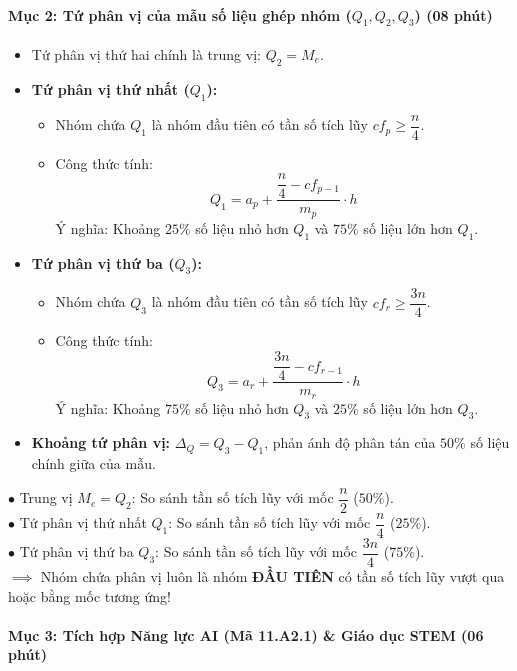 \documentclass[12pt, a4paper]{article}
\begin{document}
\paragraph{Mục 2: Tứ phân vị của mẫu số liệu ghép nhóm ($Q_1, Q_2, Q_3$) (08 phút)}
\begin{itemize}
    \item Tứ phân vị thứ hai chính là trung vị: $Q_2 = M_e$.
    \item \textbf{Tứ phân vị thứ nhất ($Q_1$):}
    \begin{itemize}
        \item Nhóm chứa $Q_1$ là nhóm đầu tiên có tần số tích lũy $cf_p \ge \dfrac{n}{4}$.
        \item Công thức tính:
        $$Q_1 = a_p + \dfrac{\dfrac{n}{4} - cf_{p-1}}{m_p} \cdot h$$
        Ý nghĩa: Khoảng $25\%$ số liệu nhỏ hơn $Q_1$ và $75\%$ số liệu lớn hơn $Q_1$.
    \end{itemize}
    \item \textbf{Tứ phân vị thứ ba ($Q_3$):}
    \begin{itemize}
        \item Nhóm chứa $Q_3$ là nhóm đầu tiên có tần số tích lũy $cf_r \ge \dfrac{3n}{4}$.
        \item Công thức tính:
        $$Q_3 = a_r + \dfrac{\dfrac{3n}{4} - cf_{r-1}}{m_r} \cdot h$$
        Ý nghĩa: Khoảng $75\%$ số liệu nhỏ hơn $Q_3$ và $25\%$ số liệu lớn hơn $Q_3$.
    \end{itemize}
    \item \textbf{Khoảng tứ phân vị:} $\Delta_Q = Q_3 - Q_1$, phản ánh độ phân tán của $50\%$ số liệu chính giữa của mẫu.
\end{itemize}

\begin{scaffoldbox}
    $\bullet$ Trung vị $M_e = Q_2$: So sánh tần số tích lũy với mốc $\dfrac{n}{2}$ ($50\%$).\\
    $\bullet$ Tứ phân vị thứ nhất $Q_1$: So sánh tần số tích lũy với mốc $\dfrac{n}{4}$ ($25\%$).\\
    $\bullet$ Tứ phân vị thứ ba $Q_3$: So sánh tần số tích lũy với mốc $\dfrac{3n}{4}$ ($75\%$).\\
    $\implies$ Nhóm chứa phân vị luôn là nhóm \textbf{ĐẦU TIÊN} có tần số tích lũy vượt qua hoặc bằng mốc tương ứng!
\end{scaffoldbox}

\paragraph{Mục 3: Tích hợp Năng lực AI (Mã 11.A2.1) \& Giáo dục STEM (06 phút)}
\end{document}
